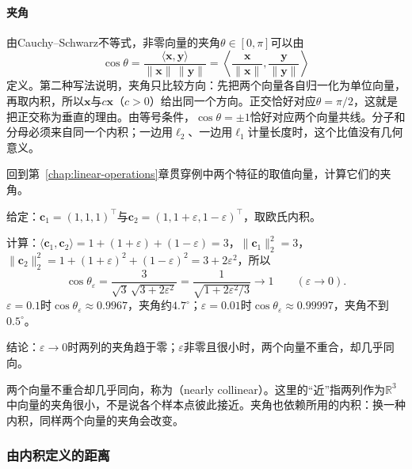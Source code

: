 \paragraph{夹角}
由Cauchy--Schwarz不等式，非零向量的夹角$\theta\in[0,\pi]$可以由
\[
 \cos\theta=\frac{\langle\bm x,\bm y\rangle}{\lVert\bm x\rVert\,\lVert\bm y\rVert}
 =\left\langle\frac{\bm x}{\lVert\bm x\rVert},\frac{\bm y}{\lVert\bm y\rVert}\right\rangle
\]
定义。第二种写法说明，夹角只比较方向：先把两个向量各自归一化为单位向量，再取内积，所以$\bm x$与$c\bm x$（$c>0$）给出同一个方向。正交恰好对应$\theta=\pi/2$，这就是把正交称为垂直的理由。由等号条件，$\cos\theta=\pm1$恰好对应两个向量共线。分子和分母必须来自同一个内积；一边用$\ell_2$、一边用$\ell_1$计量长度时，这个比值没有几何意义。

回到第~\ref{chap:linear-operations}章贯穿例中两个特征的取值向量，计算它们的夹角。
\begin{example}[贯穿例两列的夹角]
\label{ex:ls-nearly-collinear-angle}
给定：$\bm c_1=(1,1,1)^\top$与$\bm c_2=(1,1+\varepsilon,1-\varepsilon)^\top$，取欧氏内积。

计算：$\langle\bm c_1,\bm c_2\rangle=1+(1+\varepsilon)+(1-\varepsilon)=3$，$\lVert\bm c_1\rVert_2^2=3$，$\lVert\bm c_2\rVert_2^2=1+(1+\varepsilon)^2+(1-\varepsilon)^2=3+2\varepsilon^2$，所以
\begin{equation}
 \cos\theta_\varepsilon=\frac{3}{\sqrt3\,\sqrt{3+2\varepsilon^2}}
 =\frac{1}{\sqrt{1+2\varepsilon^2/3}}\longrightarrow1\qquad(\varepsilon\to0).
 \label{eq:linear-algebra-nearly-collinear-angle}
\end{equation}
$\varepsilon=0.1$时$\cos\theta_\varepsilon\approx0.9967$，夹角约$4.7^\circ$；$\varepsilon=0.01$时$\cos\theta_\varepsilon\approx0.99997$，夹角不到$0.5^\circ$。

结论：$\varepsilon\to0$时两列的夹角趋于零；$\varepsilon$非零且很小时，两个向量不重合，却几乎同向。
\end{example}
两个向量不重合却几乎同向，称为（nearly collinear）。这里的“近”指两列作为$\mathbb R^3$中向量的夹角很小，不是说各个样本点彼此接近。夹角也依赖所用的内积：换一种内积，同样两个向量的夹角会改变。

\subsubsection{由内积定义的距离}
\label{sec:ls-inner-product-distance}

